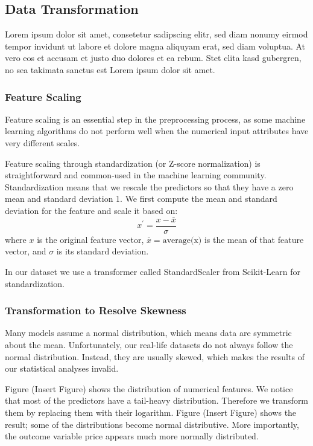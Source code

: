 \subsection{Data Transformation}

Lorem ipsum dolor sit amet, consetetur sadipscing elitr, sed diam nonumy eirmod
tempor invidunt ut labore et dolore magna aliquyam erat, sed diam voluptua. At
vero eos et accusam et justo duo dolores et ea rebum. Stet clita kasd gubergren,
no sea takimata sanctus est Lorem ipsum dolor sit amet.

\subsubsection{Feature Scaling}

Feature scaling is an essential step in the preprocessing process, as some
machine learning algorithms do not perform well when the numerical input
attributes have very different scales.

Feature scaling through standardization (or Z-score normalization) is straightforward and
common-used in the machine learning community.
Standardization means that we rescale the predictors so that they have a zero
mean and standard deviation 1.  We first compute the mean and standard deviation
for the feature and scale it based on:
\[x^{'} = \frac{x - \bar{x}}{\sigma}\]
where $x$ is the original feature vector, $\bar{x} = \textrm{average(x)}$ is the mean of
that feature vector, and $\sigma$ is its standard deviation.

\noindent In our dataset we use  a transformer called StandardScaler from Scikit-Learn for
standardization.

\subsubsection{Transformation to Resolve Skewness}

Many models assume a normal distribution, which means data are symmetric about
the mean.
Unfortunately, our real-life datasets do not always follow the normal
distribution.  Instead, they are usually skewed, which makes the results of our
statistical analyses invalid.

Figure (Insert Figure) shows the distribution of numerical features. We notice
that most of the predictors have a tail-heavy distribution. Therefore we
transform them by replacing them with their logarithm. Figure (Insert Figure)
shows the result; some of the distributions become normal distributive. More
importantly, the outcome variable price appears much more normally distributed.

